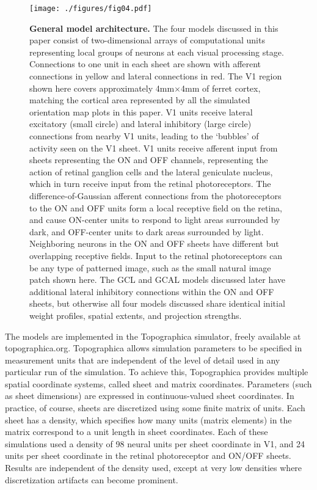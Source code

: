 \documentclass{article}
\def \scalefactor {0.666666}
\def \schematicScale {\scalefactor}        %
\begin{document}
\begin{figure}
\centerline{
\texttt{[image: ./figures/fig04.pdf]}
}
\caption[General model architecture]{ \textbf{General model
    architecture.}  The four models discussed in this paper consist of
  two-dimensional arrays of computational units representing local
  groups of neurons at each visual processing stage. Connections to
  one unit in each sheet are shown with afferent connections in yellow
  and lateral connections in red. The V1 region shown here covers
  approximately 4mm$\times$4mm of ferret cortex, matching the cortical
  area represented by all the simulated orientation map plots in this
  paper. V1 units receive lateral excitatory (small circle) and
  lateral inhibitory (large circle) connections from nearby V1 units,
  leading to the `bubbles' of activity seen on the V1 sheet.
  V1 units receive afferent input from sheets
  representing the ON and OFF channels, representing the action of
  retinal ganglion cells and the lateral geniculate nucleus, which in
  turn receive input from the retinal photoreceptors. The
  difference-of-Gaussian afferent connections from the photoreceptors
  to the ON and OFF units form a local receptive field on the retina,
  and cause ON-center units to respond to light areas surrounded by
  dark, and OFF-center units to dark areas surrounded by light.
  Neighboring neurons in the ON and OFF sheets have different but
  overlapping receptive fields.  Input to the retinal photoreceptors
  can be any type of patterned image, such as the small natural image
  patch shown here. The GCL and GCAL models discussed later have
  additional lateral inhibitory connections within the ON and OFF
  sheets, but otherwise all four models discussed share identical
  initial weight profiles, spatial extents, and projection
  strengths.} \label{fig:modelarchitecture}

\end{figure}

The models are implemented in the Topographica simulator, freely
available at topographica.org. Topographica allows simulation
parameters to be specified in measurement units that are independent
of the level of detail used in any particular run of the
simulation. To achieve this, Topographica provides multiple spatial
coordinate systems, called sheet and matrix coordinates. Parameters
(such as sheet dimensions) are expressed in continuous-valued sheet
coordinates. In practice, of course, sheets are discretized using some
finite matrix of units. Each sheet has a density,
which specifies how many units (matrix elements) in the matrix
correspond to a unit length in sheet coordinates.  Each of these
simulations used a density of 98 neural units per sheet coordinate in
V1, and 24 units per sheet coordinate in the retinal photoreceptor and
ON/OFF sheets. Results are independent of the density used, except at
very low densities where discretization artifacts can become
prominent.
\end{document}
